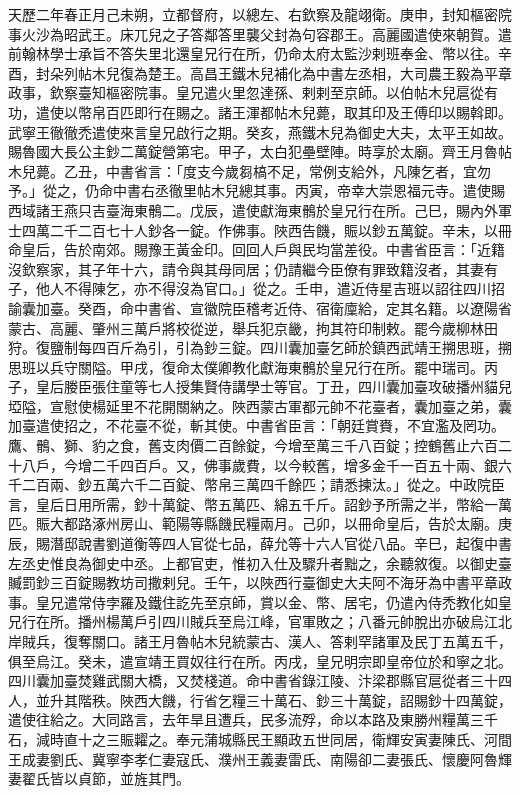 
\begin{pinyinscope}

 天歷二年春正月己未朔，立都督府，以總左、右欽察及龍翊衛。庚申，封知樞密院事火沙為昭武王。床兀兒之子答鄰答里襲父封為句容郡王。高麗國遣使來朝賀。遣前翰林學士承旨不答失里北還皇兄行在所，仍命太府太監沙剌班奉金、幣以往。辛酉，封朵列帖木兒復為楚王。高昌王鐵木兒補化為中書左丞相，大司農王毅為平章政事，欽察臺知樞密院事。皇兄遣火里忽達孫、剌剌至京師。以伯帖木兒扈從有功，遣使以幣帛百匹即行在賜之。諸王渾都帖木兒薨，取其印及王傅印以賜斡即。武寧王徹徹禿遣使來言皇兄啟行之期。癸亥，燕鐵木兒為御史大夫，太平王如故。賜魯國大長公主鈔二萬錠營第宅。甲子，太白犯壘壁陣。時享於太廟。齊王月魯帖木兒薨。乙丑，中書省言：「度支今歲芻槁不足，常例支給外，凡陳乞者，宜勿予。」從之，仍命中書右丞徹里帖木兒總其事。丙寅，帝幸大崇恩福元寺。遣使賜西域諸王燕只吉臺海東鶻二。戊辰，遣使獻海東鶻於皇兄行在所。己巳，賜內外軍士四萬二千二百七十人鈔各一錠。作佛事。陜西告饑，賑以鈔五萬錠。辛未，以冊命皇后，告於南郊。賜豫王黃金印。回回人戶與民均當差役。中書省臣言：「近籍沒欽察家，其子年十六，請令與其母同居；仍請繼今臣僚有罪致籍沒者，其妻有子，他人不得陳乞，亦不得沒為官口。」從之。壬申，遣近侍星吉班以詔往四川招諭囊加臺。癸酉，命中書省、宣徽院臣稽考近侍、宿衛廩給，定其名籍。以遼陽省蒙古、高麗、肇州三萬戶將校從逆，舉兵犯京畿，拘其符印制敕。罷今歲柳林田狩。復鹽制每四百斤為引，引為鈔三錠。四川囊加臺乞師於鎮西武靖王搠思班，搠思班以兵守關隘。甲戌，復命太僕卿教化獻海東鶻於皇兄行在所。罷中瑞司。丙子，皇后媵臣張住童等七人授集賢侍講學士等官。丁丑，四川囊加臺攻破播州貓兒埡隘，宣慰使楊延里不花開關納之。陜西蒙古軍都元帥不花臺者，囊加臺之弟，囊加臺遣使招之，不花臺不從，斬其使。中書省臣言：「朝廷賞賚，不宜濫及罔功。鷹、鶻、獅、豹之食，舊支肉價二百餘錠，今增至萬三千八百錠；控鶴舊止六百二十八戶，今增二千四百戶。又，佛事歲費，以今較舊，增多金千一百五十兩、銀六千二百兩、鈔五萬六千二百錠、幣帛三萬四千餘匹；請悉揀汰。」從之。中政院臣言，皇后日用所需，鈔十萬錠、幣五萬匹、綿五千斤。詔鈔予所需之半，幣給一萬匹。賑大都路涿州房山、範陽等縣饑民糧兩月。己卯，以冊命皇后，告於太廟。庚辰，賜潛邸說書劉道衡等四人官從七品，薛允等十六人官從八品。辛巳，起復中書左丞史惟良為御史中丞。上都官吏，惟初入仕及驟升者黜之，余聽敘復。以御史臺贓罰鈔三百錠賜教坊司撒剌兒。壬午，以陜西行臺御史大夫阿不海牙為中書平章政事。皇兄遣常侍孛羅及鐵住訖先至京師，賞以金、幣、居宅，仍遣內侍禿教化如皇兄行在所。播州楊萬戶引四川賊兵至烏江峰，官軍敗之；八番元帥脫出亦破烏江北岸賊兵，復奪關口。諸王月魯帖木兒統蒙古、漢人、答剌罕諸軍及民丁五萬五千，俱至烏江。癸未，遣宣靖王買奴往行在所。丙戌，皇兄明宗即皇帝位於和寧之北。四川囊加臺焚雞武關大橋，又焚棧道。命中書省錄江陵、汴梁郡縣官扈從者三十四人，並升其階秩。陜西大饑，行省乞糧三十萬石、鈔三十萬錠，詔賜鈔十四萬錠，遣使往給之。大同路言，去年旱且遭兵，民多流殍，命以本路及東勝州糧萬三千石，減時直十之三賑糶之。奉元蒲城縣民王顯政五世同居，衛輝安寅妻陳氏、河間王成妻劉氏、冀寧李孝仁妻寇氏、濮州王義妻雷氏、南陽卻二妻張氏、懷慶阿魯輝妻翟氏皆以貞節，並旌其門。




\end{pinyinscope}
